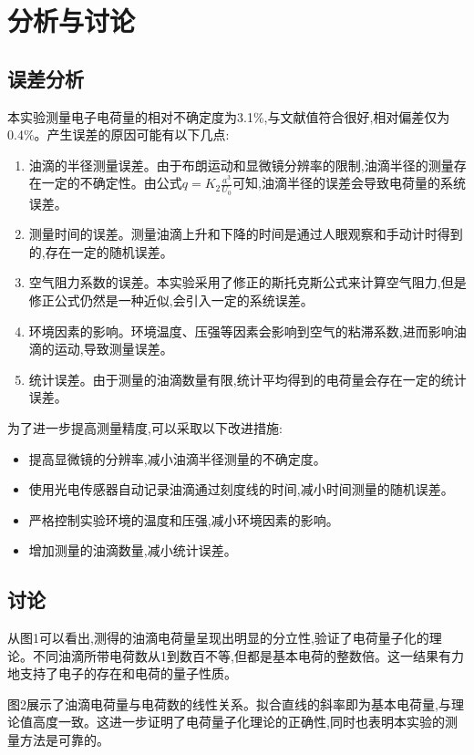 \documentclass[UTF8]{ctexart}
\begin{document}
\newpage
\section{分析与讨论}

\subsection{误差分析}

本实验测量电子电荷量的相对不确定度为3.1\%,与文献值符合很好,相对偏差仅为0.4\%。产生误差的原因可能有以下几点:

\begin{enumerate}
  \item 油滴的半径测量误差。由于布朗运动和显微镜分辨率的限制,油滴半径的测量存在一定的不确定性。由公式$q=K_2\frac{a^3}{U_0}$可知,油滴半径的误差会导致电荷量的系统误差。
  \item 测量时间的误差。测量油滴上升和下降的时间是通过人眼观察和手动计时得到的,存在一定的随机误差。
  \item 空气阻力系数的误差。本实验采用了修正的斯托克斯公式来计算空气阻力,但是修正公式仍然是一种近似,会引入一定的系统误差。
  \item 环境因素的影响。环境温度、压强等因素会影响到空气的粘滞系数,进而影响油滴的运动,导致测量误差。
  \item 统计误差。由于测量的油滴数量有限,统计平均得到的电荷量会存在一定的统计误差。
\end{enumerate}

为了进一步提高测量精度,可以采取以下改进措施:
\begin{itemize}
  \item 提高显微镜的分辨率,减小油滴半径测量的不确定度。
  \item 使用光电传感器自动记录油滴通过刻度线的时间,减小时间测量的随机误差。
  \item 严格控制实验环境的温度和压强,减小环境因素的影响。
  \item 增加测量的油滴数量,减小统计误差。
\end{itemize}

\subsection{讨论}

从图1可以看出,测得的油滴电荷量呈现出明显的分立性,验证了电荷量子化的理论。不同油滴所带电荷数从1到数百不等,但都是基本电荷的整数倍。这一结果有力地支持了电子的存在和电荷的量子性质。

图2展示了油滴电荷量与电荷数的线性关系。拟合直线的斜率即为基本电荷量,与理论值高度一致。这进一步证明了电荷量子化理论的正确性,同时也表明本实验的测量方法是可靠的。
\end{document}

